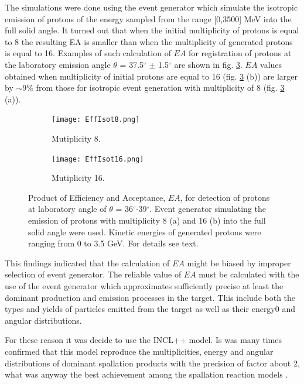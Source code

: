 The simulations were done using the event generator which simulate the isotropic emission of protons of the energy sampled from the range [0,3500] MeV into the full solid angle. It turned out that when the initial multiplicity of protons is equal to 8 
the resulting EA is smaller than when the multiplicity of generated protons is equal to 16.
Examples of such calculation of $EA$ for registration  of protons at the laboratory emission angle $\theta$ = 37.5$^{\circ}$ $\pm$ 1.5$^{\circ}$ are shown in fig. \ref{IsoEff}. $EA$ values obtained when multiplicity of initial protons are equal to 16 (fig. \ref{IsoEff} (b)) are larger by $\sim$9\% from those for isotropic event generation with multiplicity of 8 (fig. \ref{IsoEff} (a)).  

    \begin{figure}
    \centering
	\begin{subfigure}[b]{0.45\textwidth}
		\texttt{[image: EffIsot8.png]}
		\caption{\label{IsoEff8} Mutiplicity 8.}
	\end{subfigure}
	\begin{subfigure}[b]{0.45\textwidth}
		\texttt{[image: EffIsot16.png]}
		\caption{\label{IsoEff16} Mutiplicity 16.}
	\end{subfigure}
	\caption{\label{IsoEff} Product of Efficiency and Acceptance,  $EA$, for detection of protons at laboratory angle of $\theta$ = 36$^\circ$-39$^\circ$. Event generator simulating the emission of protons with multiplicity 8 (a) and 16 (b) into the full solid angle were used. Kinetic energies of generated protons were ranging from 0 to 3.5 GeV. For details see text.}
\end{figure}

This findings indicated that the calculation of $EA$ might 
be biased by improper selection of event generator. The reliable value of $EA$ must be calculated with the use of the event generator
which approximates sufficiently precise at least the dominant production and emission processes 
in the target. This include both the types and yields of particles emitted from the target as well as their energy0 and angular distributions.

For these reason it was decide to use the INCL++ model. Is was many times confirmed that this model reproduce the multiplicities, energy and angular distributions of dominant spallation products with the precision of factor about 2, what was anyway the best achievement among the spallation reaction models \cite{INCLMancusi2014,UrQMDBASS1998,UrQMDBleicher1999}.
 
